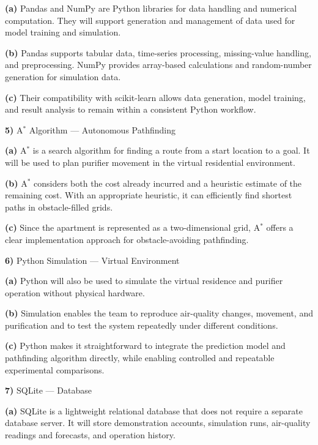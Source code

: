 \documentclass[conference]{IEEEtran}
\begin{document}
\par\noindent\textbf{(a)} Pandas and NumPy are Python libraries for data handling and numerical computation. They will support generation and management of data used for model training and simulation.
\par\noindent\textbf{(b)} Pandas supports tabular data, time-series processing, missing-value handling, and preprocessing. NumPy provides array-based calculations and random-number generation for simulation data.
\par\noindent\textbf{(c)} Their compatibility with scikit-learn allows data generation, model training, and result analysis to remain within a consistent Python workflow.
\par\noindent\textbf{5)} A$^*$ Algorithm --- Autonomous Pathfinding
\par\noindent\textbf{(a)} A$^*$ is a search algorithm for finding a route from a start location to a goal. It will be used to plan purifier movement in the virtual residential environment.
\par\noindent\textbf{(b)} A$^*$ considers both the cost already incurred and a heuristic estimate of the remaining cost. With an appropriate heuristic, it can efficiently find shortest paths in obstacle-filled grids.
\par\noindent\textbf{(c)} Since the apartment is represented as a two-dimensional grid, A$^*$ offers a clear implementation approach for obstacle-avoiding pathfinding.
\par\noindent\textbf{6)} Python Simulation --- Virtual Environment
\par\noindent\textbf{(a)} Python will also be used to simulate the virtual residence and purifier operation without physical hardware.
\par\noindent\textbf{(b)} Simulation enables the team to reproduce air-quality changes, movement, and purification and to test the system repeatedly under different conditions.
\par\noindent\textbf{(c)} Python makes it straightforward to integrate the prediction model and pathfinding algorithm directly, while enabling controlled and repeatable experimental comparisons.
\par\noindent\textbf{7)} SQLite --- Database
\par\noindent\textbf{(a)} SQLite is a lightweight relational database that does not require a separate database server. It will store demonstration accounts, simulation runs, air-quality readings and forecasts, and operation history.
\end{document}
